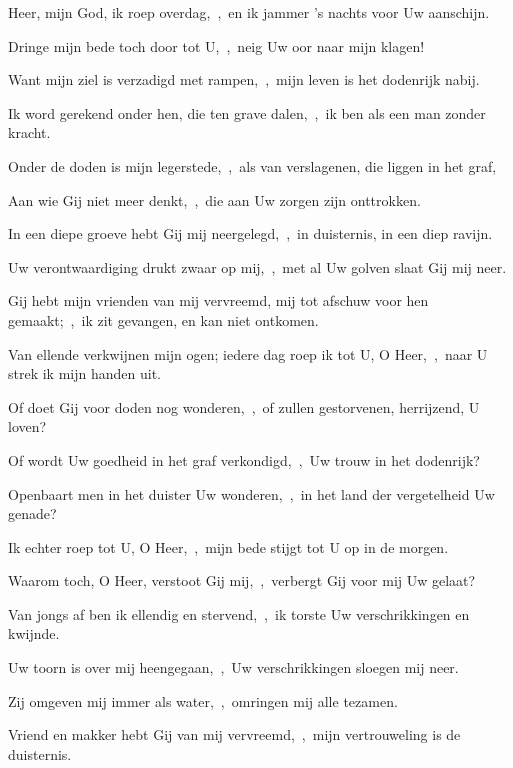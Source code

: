 \documentclass[12pt,twoside,a5paper]{article}
\begin{document}
\begin{halfparskip}
  Heer, mijn God, ik roep overdag,~\sep\ en ik jammer 's nachts voor Uw aanschijn.


  Dringe mijn bede toch door tot U,~\sep\ neig Uw oor naar mijn klagen!

  Want mijn ziel is verzadigd met rampen,~\sep\ mijn leven is het dodenrijk nabij.

  Ik word gerekend onder hen, die ten grave dalen,~\sep\ ik ben als een man zonder kracht.

  Onder de doden is mijn legerstede,~\sep\ als van verslagenen, die liggen in het graf,

  Aan wie Gij niet meer denkt,~\sep\ die aan Uw zorgen zijn onttrokken.

  In een diepe groeve hebt Gij mij neergelegd,~\sep\ in duisternis, in een diep ravijn.

  Uw verontwaardiging drukt zwaar op mij,~\sep\ met al Uw golven slaat Gij mij neer.

  Gij hebt mijn vrienden van mij vervreemd, mij tot afschuw voor hen gemaakt;~\sep\ ik zit gevangen, en kan niet ontkomen.
\end{halfparskip}


\begin{halfparskip}
  Van ellende verkwijnen mijn ogen; iedere dag roep ik tot U, O Heer,~\sep\ naar U strek ik mijn handen uit.

  Of doet Gij voor doden nog wonderen,~\sep\ of zullen gestorvenen, herrijzend, U loven?

  Of wordt Uw goedheid in het graf verkondigd,~\sep\ Uw trouw in het dodenrijk?

  Openbaart men in het duister Uw wonderen,~\sep\ in het land der vergetelheid Uw genade?
\end{halfparskip}


\begin{halfparskip}
  Ik echter roep tot U, O Heer,~\sep\ mijn bede stijgt tot U op in de morgen.

  Waarom toch, O Heer, verstoot Gij mij,~\sep\ verbergt Gij voor mij Uw gelaat?

  Van jongs af ben ik ellendig en stervend,~\sep\ ik torste Uw verschrikkingen en kwijnde.

  Uw toorn is over mij heengegaan,~\sep\ Uw verschrikkingen sloegen mij neer.

  Zij omgeven mij immer als water,~\sep\ omringen mij alle tezamen.

  Vriend en makker hebt Gij van mij vervreemd,~\sep\ mijn vertrouweling is de duisternis.
\end{halfparskip}
\end{document}
